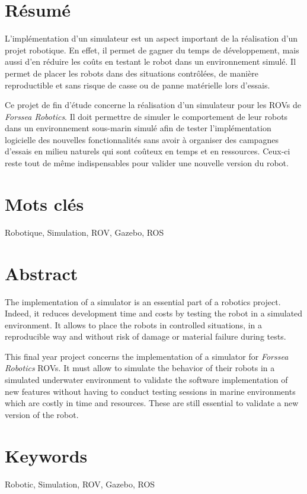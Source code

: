 \section*{Résumé}
	L'implémentation d'un simulateur est un aspect important de la réalisation d'un projet robotique. En effet, il permet de gagner du temps de développement, mais aussi d'en réduire les coûts en testant le robot dans un environnement simulé. Il permet de placer les robots dans des situations contrôlées, de manière reproductible et sans risque de casse ou de panne matérielle lors d'essais.

	Ce projet de fin d'étude concerne la réalisation d'un simulateur pour les \gls{ROV}s de \textit{Forssea Robotics}. Il doit permettre de simuler le comportement de leur robots dans un environnement sous-marin simulé afin de tester l'implémentation logicielle des nouvelles fonctionnalités sans avoir à organiser des campagnes d'essais en milieu naturels qui sont coûteux en temps et en ressources. Ceux-ci reste tout de même indispensables pour valider une nouvelle version du robot.

\section*{Mots clés}
Robotique, Simulation, ROV, Gazebo, ROS

\section*{Abstract}

	The implementation of a simulator is an essential part of a robotics project. Indeed, it reduces development time and costs by testing the robot in a simulated environment. It allows to place the robots in controlled situations, in a reproducible way and without risk of damage or material failure during tests.

	This final year project concerns the implementation of a simulator for \textit{Forssea Robotics} \gls{ROV}s. It must allow to simulate the behavior of their robots in a simulated underwater environment to validate the software implementation of new features without having to conduct testing sessions in marine environments which are costly in time and resources. These are still essential to validate a new version of the robot.
	
\section*{Keywords}
Robotic, Simulation, ROV, Gazebo, ROS

